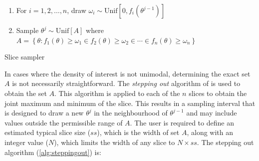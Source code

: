 \documentclass[article]{jss}
\begin{document}
%
\begin{algorithm}[H]
\begin{enumerate}
\item For $i=1,2,\dots,n$, draw $\omega_{i}\sim\mbox{Unif}[0,f_{i}(\theta^{j-1})]$ 
\item Sample $\theta^{j}\sim\mbox{Unif}[A]$ where $A=\left\{ \theta:f_{1}(\theta)\ge\omega_{1}\in f_{2}(\theta)\ge\omega_{2}\in\cdots\in f_{n}(\theta)\ge\omega_{n}\right\} $ 
\end{enumerate}
\caption{Slice sampler}
\label{alg:slicesamp}
\end{algorithm}


In cases where the density of interest is not unimodal, determining
the exact set $A$ is not necessarily straightforward. The
\emph{stepping out} algorithm of \citet{Radford2003} is used to obtain
the set $A$.  This algorithm is applied to each of the $n$ slices to
obtain the joint maximum and minimum of the slice. This results in a
sampling interval that is designed to draw a new $\theta^{j}$ in the
neighbourhood of $\theta^{j-1}$ and may include values outside the
permissible range of $A$. The user is required to define an estimated
typical slice size ($ss$), which is the width of set $A$, along with
an integer value ($N$), which limits the width of any slice to $N\times ss$.
The stepping out algorithm (\ref{alg:steppingout}) is:
\end{document}
